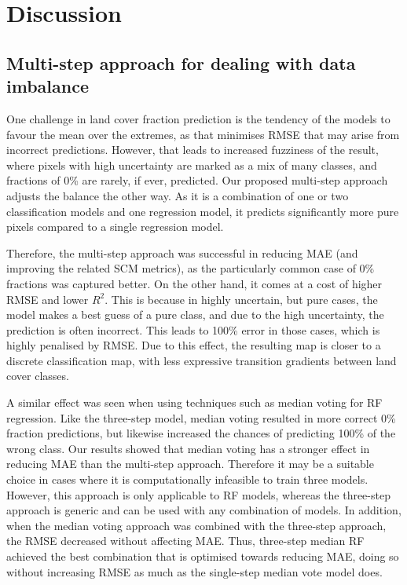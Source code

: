 \documentclass[review,authoryear,3p]{elsarticle}
\begin{document}
\section{Discussion}

\subsection{Multi-step approach for dealing with data imbalance}

One challenge in land cover fraction prediction is the tendency of the models to favour the mean over the extremes, as that minimises \gls{RMSE} that may arise from incorrect predictions.
However, that leads to increased fuzziness of the result, where pixels with high uncertainty are marked as a mix of many classes, and fractions of 0\% are rarely, if ever, predicted.
Our proposed multi-step approach adjusts the balance the other way.
As it is a combination of one or two classification models and one regression model, it predicts significantly more pure pixels compared to a single regression model.

Therefore, the multi-step approach was successful in reducing \gls{MAE} (and improving the related \gls{SCM} metrics), as the particularly common case of 0\% fractions was captured better.
On the other hand, it comes at a cost of higher \gls{RMSE} and lower $R^2$.
This is because in highly uncertain, but pure cases, the model makes a best guess of a pure class, and due to the high uncertainty, the prediction is often incorrect.
This leads to 100\% error in those cases, which is highly penalised by \gls{RMSE}.
Due to this effect, the resulting map is closer to a discrete classification map, with less expressive transition gradients between land cover classes.

A similar effect was seen when using techniques such as median voting for \gls{RF} regression.
Like the three-step model, median voting resulted in more correct 0\% fraction predictions, but likewise increased the chances of predicting 100\% of the wrong class.
Our results showed that median voting has a stronger effect in reducing \gls{MAE} than the multi-step approach.
Therefore it may be a suitable choice in cases where it is computationally infeasible to train three models.
However, this approach is only applicable to \gls{RF} models, whereas the three-step approach is generic and can be used with any combination of models.
In addition, when the median voting approach was combined with the three-step approach, the \gls{RMSE} decreased without affecting \gls{MAE}.
Thus, three-step median \gls{RF} achieved the best combination that is optimised towards reducing \gls{MAE}, doing so without increasing \gls{RMSE} as much as the single-step median vote model does.
\end{document}
